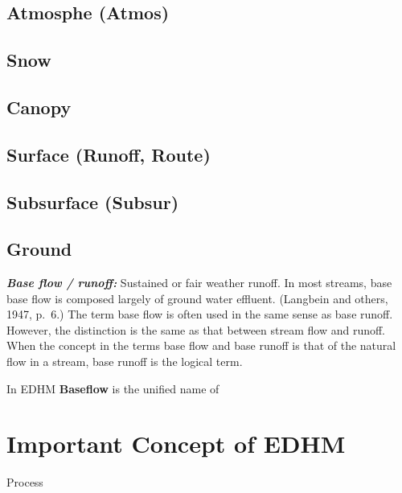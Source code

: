 \documentclass[
]{book}
\begin{document}
\hypertarget{atmosphe-atmos}{%
\subsection{Atmosphe (Atmos)}\label{atmosphe-atmos}}

\hypertarget{snow}{%
\subsection{Snow}\label{snow}}

\hypertarget{canopy}{%
\subsection{Canopy}\label{canopy}}

\hypertarget{surface-runoff-route}{%
\subsection{Surface (Runoff, Route)}\label{surface-runoff-route}}

\hypertarget{subsurface-subsur}{%
\subsection{Subsurface (Subsur)}\label{subsurface-subsur}}

\hypertarget{ground}{%
\subsection{Ground}\label{ground}}

\textbf{\emph{Base flow / runoff:}} Sustained or fair weather runoff. In most streams, base base flow is composed largely of ground water effluent. (Langbein and others, 1947, p.~6.) The term base flow is often used in the same sense as base runoff. However, the distinction is the same as that between stream flow and runoff. When the concept in the terms base flow and base runoff is that of the natural flow in a stream, base runoff is the logical term.

In EDHM \textbf{Baseflow} is the unified name of

\hypertarget{important-concept-of-edhm}{%
\section{Important Concept of EDHM}\label{important-concept-of-edhm}}

Process
\end{document}
